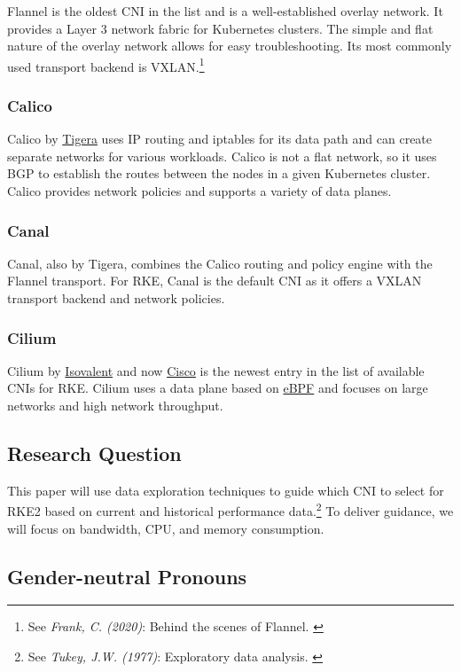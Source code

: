 Flannel is the oldest CNI in the list and is a well-established overlay network. It provides a Layer 3 network fabric for Kubernetes clusters. The simple and flat nature of the overlay network allows for easy troubleshooting. Its most commonly used transport backend is VXLAN.\footnote{See \textit{Frank, C. (2020)}: Behind the scenes of Flannel. \cite{flannel}}

\subsubsection{Calico}

Calico by \href{https://www.tigera.io/}{Tigera} uses IP routing and iptables for its data path and can create separate networks for various workloads. Calico is not a flat network, so it uses BGP to establish the routes between the nodes in a given Kubernetes cluster. Calico provides network policies and supports a variety of data planes.

\subsubsection{Canal}

Canal, also by Tigera, combines the Calico routing and policy engine with the Flannel transport. For RKE, Canal is the default CNI as it offers a VXLAN transport backend and network policies.

\subsubsection{Cilium}

Cilium by \href{https://isovalent.com/}{Isovalent} and now \href{https://www.cisco.com/}{Cisco} is the newest entry in the list of available CNIs for RKE. Cilium uses a data plane based on \href{https://ebpf.io/}{eBPF} and focuses on large networks and high network throughput.

\subsection{Research Question}

This paper will use data exploration techniques to guide which CNI to select for RKE2 based on current and historical performance data.\footnote{See \textit{Tukey, J.W. (1977)}: Exploratory data analysis. \cite{exploratoryDA}} To deliver guidance, we will focus on bandwidth, CPU, and memory consumption.

\subsection{Gender-neutral Pronouns}


